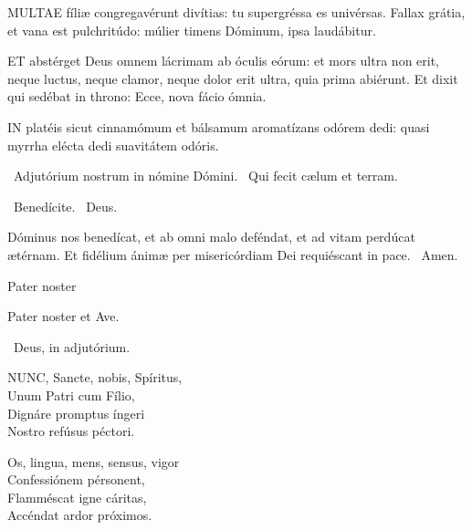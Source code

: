 \lettrine[lines=2]{M}{ULTAE} fíliæ congregavérunt divítias: tu supergréssa es univérsas. Fallax grátia, et vana est pulchritúdo: múlier timens Dóminum, ipsa laudábitur.


\lettrine[lines=2]{E}{T} abstérget Deus omnem lácrimam ab óculis eórum: et mors ultra non erit, neque luctus, neque clamor, neque dolor erit ultra, quia prima abiérunt. Et dixit qui sedébat in throno: Ecce, nova fácio ómnia.


\lettrine[lines=2]{I}{N} platéis sicut cinnamómum et bálsamum aromatízans odórem dedi: quasi myrrha elécta dedi suavitátem odóris.

\sectionornament

\V\ Adjutórium nostrum in nómine Dómini. \R\ Qui fecit cælum et terram.

\V\ Benedícite. \R\ Deus.

 Dóminus nos benedícat, et ab omni malo deféndat, et ad vitam perdúcat ætérnam. Et fidélium ánimæ per misericórdiam Dei requiéscant in pace. \R\ Amen.

 Pater noster 

\sectionornament



Pater noster et Ave.

\V\ Deus, in adjutórium.


\lettrine[lines=2]{N}{UNC}, Sancte, nobis, Spíritus,\\
Unum Patri cum Fílio,\\
Dignáre promptus íngeri\\
Nostro refúsus péctori.

Os, lingua, mens, sensus, vigor\\
Confessiónem pérsonent,\\
Flamméscat igne cáritas,\\
Accéndat ardor próximos.

